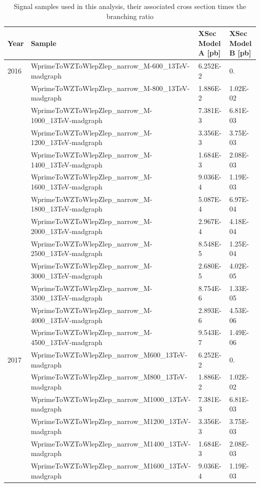 \begin{table}
\begin{center}
  \caption{Signal samples used in this analysis, their associated cross section
  times the branching ratio}
\footnotesize
\begin{tabular}{|l|l|l|l|}
\hline
Year & Sample & XSec Model A [pb] & XSec Model B [pb]\\ \hline
\hline
2016 & WprimeToWZToWlepZlep\_narrow\_M-600\_13TeV-madgraph  & 6.252E-2 & 0. \\
 &WprimeToWZToWlepZlep\_narrow\_M-800\_13TeV-madgraph  & 1.886E-2 & 1.02E-02\\
 &WprimeToWZToWlepZlep\_narrow\_M-1000\_13TeV-madgraph & 7.381E-3 & 6.81E-03\\
 &WprimeToWZToWlepZlep\_narrow\_M-1200\_13TeV-madgraph & 3.356E-3 & 3.75E-03\\
 &WprimeToWZToWlepZlep\_narrow\_M-1400\_13TeV-madgraph & 1.684E-3 & 2.08E-03\\
 &WprimeToWZToWlepZlep\_narrow\_M-1600\_13TeV-madgraph & 9.036E-4 & 1.19E-03\\
 &WprimeToWZToWlepZlep\_narrow\_M-1800\_13TeV-madgraph & 5.087E-4 & 6.97E-04\\
 &WprimeToWZToWlepZlep\_narrow\_M-2000\_13TeV-madgraph & 2.967E-4 & 4.18E-04\\
 &WprimeToWZToWlepZlep\_narrow\_M-2500\_13TeV-madgraph & 8.548E-5 & 1.25E-04\\
 &WprimeToWZToWlepZlep\_narrow\_M-3000\_13TeV-madgraph & 2.680E-5 & 4.02E-05\\
 &WprimeToWZToWlepZlep\_narrow\_M-3500\_13TeV-madgraph & 8.754E-6 & 1.33E-05\\
 &WprimeToWZToWlepZlep\_narrow\_M-4000\_13TeV-madgraph & 2.893E-6 & 4.53E-06\\
 &WprimeToWZToWlepZlep\_narrow\_M-4500\_13TeV-madgraph & 9.543E-7 & 1.49E-06\\
\hline
2017 & WprimeToWZToWlepZlep\_narrow\_M600\_13TeV-madgraph  & 6.252E-2 & 0. \\
 &WprimeToWZToWlepZlep\_narrow\_M800\_13TeV-madgraph  & 1.886E-2 & 1.02E-02\\
 &WprimeToWZToWlepZlep\_narrow\_M1000\_13TeV-madgraph & 7.381E-3 & 6.81E-03\\
 &WprimeToWZToWlepZlep\_narrow\_M1200\_13TeV-madgraph & 3.356E-3 & 3.75E-03\\
 &WprimeToWZToWlepZlep\_narrow\_M1400\_13TeV-madgraph & 1.684E-3 & 2.08E-03\\
 &WprimeToWZToWlepZlep\_narrow\_M1600\_13TeV-madgraph & 9.036E-4 & 1.19E-03\\

\end{tabular}
\end{center}
\end{table}
